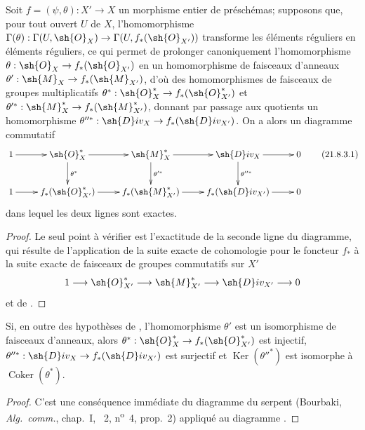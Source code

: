 \begin{proposition}[21.8.3]
\label{IV.21.8.3}
Soit $f=(\psi,\theta):X'\to X$ un morphisme entier de préschémas;
supposons que, pour tout ouvert $U$ de $X$, l'homomorphisme $\Gamma(\theta):\Gamma(U,\sh{O}_X)\to\Gamma(U,f_*(\sh{O}_{X'}))$ transforme les éléments réguliers en éléments réguliers, ce qui permet de prolonger canoniquement l'homomorphisme $\theta:\sh{O}_X\to f_*(\sh{O}_{X'})$ en un homomorphisme de faisceaux d'anneaux $\theta':\sh{M}_X\to f_*(\sh{M}_{X'})$, d'où des homomorphismes de faisceaux de groupes multiplicatifs $\theta^*:\sh{O}^*_X\to f_*(\sh{O}^*_{X'})$ et $\theta'^*:\sh{M}^*_X\to f_*(\sh{M}^*_{X'})$, donnant par passage aux quotients un homomorphisme $\theta''^*:\sh{D}iv_X\to f_*(\sh{D}iv_{X'})$.
On a alors un diagramme commutatif
\[
\label{IV.21.8.3.1}
  \xymatrix{
    1 \ar[r] & \sh{O}^*_X \ar[r] \ar[d]^{\theta^*} & \sh{M}^*_X \ar[r] \ar[d]^{\theta'^*} & \sh{D}iv_X \ar[r] \ar[d]^{\theta''^*} & 0\\
    1 \ar[r] & f_*(\sh{O}^*_{X'}) \ar[r] & f_*(\sh{M}^*_{X'}) \ar[r] & f_*(\sh{D}iv_{X'}) \ar[r] & 0
  }
  \tag{21.8.3.1}
\]
dans lequel les deux lignes sont exactes.
\end{proposition}

\begin{proof}
Le seul point à vérifier est l'exactitude de la seconde ligne du diagramme, qui résulte de l'application de la suite exacte de cohomologie pour le foncteur $f_*$ à la suite exacte de faisceaux de groupes commutatifs sur $X'$
\[
  1\to\sh{O}^*_{X'}\to\sh{M}^*_{X'}\to\sh{D}iv_{X'}\to0
\]
et de .
\end{proof}

\begin{corollary}[21.8.4]
\label{IV.21.8.4}
Si, en outre des hypothèses de , l'homomorphisme $\theta'$ est un isomorphisme de faisceaux d'anneaux, alors $\theta^*:\sh{O}^*_X\to f_*(\sh{O}^*_{X'})$ est injectif, $\theta''^*:\sh{D}iv_X\to f_*(\sh{D}iv_{X'})$ est surjectif et $\operatorname{Ker}(\theta''^*)$ est isomorphe à $\operatorname{Coker}(\theta^*)$.
\end{corollary}

\begin{proof}
C'est une conséquence immédiate du diagramme du serpent (Bourbaki, \emph{Alg.\ comm.}, chap.~I, \textsection~2, n\textsuperscript{o}~4, prop.~2) appliqué au diagramme .
\end{proof}


